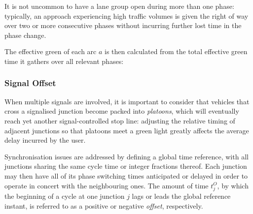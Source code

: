 
It is not uncommon to have a lane group open during more than one phase: typically, an
approach experiencing high traffic volumes is given the right of way over two or more
consecutive phases without incurring further lost time in the phase change.

The effective green of each arc $a$ is then calculated from the total effective green time it
gathers over all relevant phases:

\subsubsection{Signal Offset}
When multiple signals are involved, it is important to consider that vehicles that cross a signalised junction become packed into \emph{platoons}, which will eventually reach yet another signal-controlled stop line: adjusting the relative timing of adjacent junctions so that platoons meet a green light greatly affects the average delay incurred by the user. 

Synchronisation issues are addressed by defining a global time reference, with all junctions sharing the same cycle time or integer fractions thereof.
Each junction may then have all of its phase switching times anticipated or delayed in order to operate in concert with the neighbouring ones.
The amount of time $t_j^O$, by which the beginning of a cycle at one junction $j$ lags or leads the global reference instant, is referred to as a positive or negative \emph{offset}, respectively.